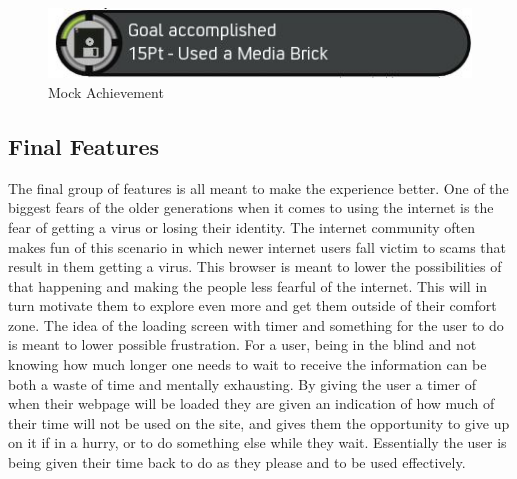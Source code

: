 \documentclass[11pt]{article}
\begin{document}
\begin{figure}[h!]
 \centering
    \includegraphics[width= 1\textwidth]{./Images/achievement}
  \caption{Mock Achievement}
 \label{Achieve}
\end{figure}

\subsection{Final Features}
The final group of features is all meant to make the experience better. One of the biggest fears of the older generations when it comes to using the internet is the fear of getting a virus or losing their identity. The internet community often makes fun of this scenario in which newer internet users fall victim to scams that result in them getting a virus. This browser is meant to lower the possibilities of that happening and making the people less fearful of the internet. This will in turn motivate them to explore even more and get them outside of their comfort zone. The idea of the loading screen with timer and something for the user to do is meant to lower possible frustration. For a user, being in the blind and not knowing how much longer one needs to wait to receive the information can be both a waste of time and mentally exhausting. By giving the user a timer of when their webpage will be loaded they are given an indication of how much of their time will not be used on the site, and gives them the opportunity to give up on it if in a hurry, or to do something else while they wait. Essentially the user is being given their time back to do as they please and to be used effectively.
\end{document}
